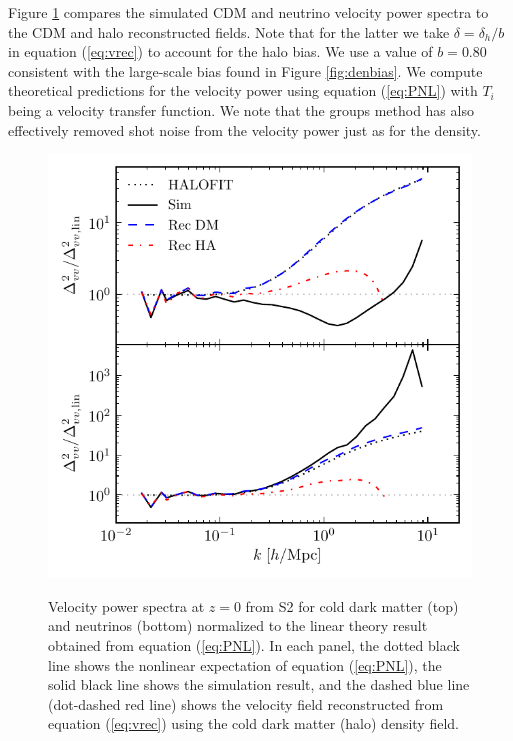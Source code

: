 Figure \ref{fig:velpow} compares the simulated CDM and neutrino velocity power spectra to the CDM and halo reconstructed fields. Note that for the latter we take $\delta = \delta_h/b$ in equation (\ref{eq:vrec}) to account for the halo bias. We use a value of $b = 0.80$ consistent with the large-scale bias found in Figure \ref{fig:denbias}.  We compute theoretical predictions for the velocity power using equation (\ref{eq:PNL}) with $T_i$ being a velocity transfer function.  We note that the groups method has also effectively removed shot noise from the velocity power just as for the density.
 
\begin{figure}[!t]
\begin{center}
\includegraphics[width=\smwidth]{./figures/neutrinos/fig6.pdf} \vspace{-0.1cm}
\caption[Cold dark matter and neutrino velocity power spectra]
{Velocity power spectra at $z = 0$ from S2 for cold
dark matter (top) and neutrinos (bottom) normalized to the
linear theory result obtained from equation (\ref{eq:PNL}).  In
each panel, the dotted black line shows the nonlinear
expectation of equation (\ref{eq:PNL}), the solid black line shows
the simulation result, and the dashed blue line (dot-dashed
red line) shows the velocity field reconstructed from
equation (\ref{eq:vrec}) using the cold dark matter (halo) density field.}
\vspace{-0.2cm}
\label{fig:velpow}
\end{center}
\end{figure}
 
